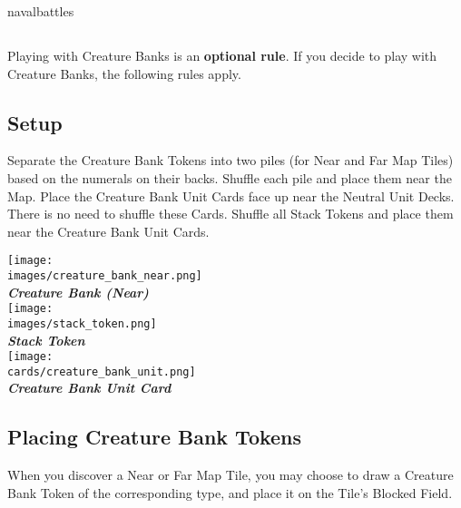 \pagebreak
\begin{expansion}[before=\vspace*{-11mm}]{navalbattles}
\begin{multicols*}{2}
    \subsection*{}
     Playing with Creature Banks is an \textbf{optional rule}.
     If you decide to play with Creature Banks, the following rules apply.

     \bigskip
     \subsection*{Setup}
     Separate the Creature Bank Tokens into two piles (for Near and Far Map Tiles) based on the numerals on their backs.
     Shuffle each pile and place them near the Map.
     Place the Creature Bank Unit Cards face up near the Neutral Unit Decks.
     There is no need to shuffle these Cards.
     Shuffle all Stack Tokens and place them near the Creature Bank Unit Cards.

      \bigskip
        \begin{multicols*}{2}
            \begin{center}
                \texttt{[image: \\images/creature\_bank\_near.png]}\\
                \vspace{-0.5em}\textbf{\footnotesize\textit{\textcolor{darkcandyapplered}{Creature Bank (Near)}}}\\
                \vspace*{\fill}
                \texttt{[image: \\images/stack\_token.png]}\\
                \textbf{\footnotesize\textit{\textcolor{darkcandyapplered}{Stack Token}}}\\
                \columnbreak
                \texttt{[image: \\cards/creature\_bank\_unit.png]}\\
                \textbf{\footnotesize\textit{\textcolor{darkcandyapplered}{Creature Bank Unit Card}}}
            \end{center}
        \end{multicols*}

    \subsection*{Placing Creature Bank Tokens}
    When you discover a Near or Far Map Tile, you may choose to draw a Creature Bank Token of the corresponding type, and place it on the Tile's Blocked Field.\par


\end{multicols*}
\end{expansion}
